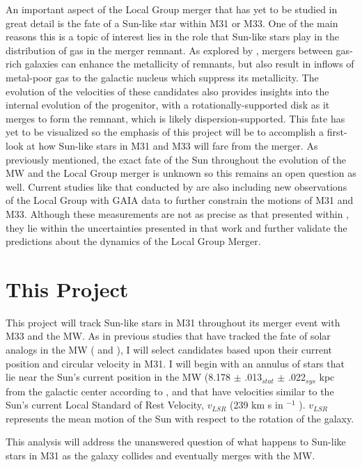 \documentclass{aastex63}
\begin{document}
An important aspect of the Local Group merger that has yet to be studied in great detail is the fate of a Sun-like star within M31 or M33. One of the main reasons this is a topic of interest lies in the role that Sun-like stars play in the distribution of gas in the merger remnant. As explored by \cite{2012ApJ...746..108T}, mergers between gas-rich galaxies can enhance the metallicity of remnants, but also result in inflows of metal-poor gas to the galactic nucleus which suppress its metallicity. The evolution of the velocities of these candidates also provides insights into the internal evolution of the progenitor, with a rotationally-supported disk as it merges to form the remnant, which is likely dispersion-supported. This fate has yet to be visualized so the emphasis of this project will be to accomplish a first-look at how Sun-like stars in M31 and M33 will fare from the merger. As previously mentioned, the exact fate of the Sun throughout the evolution of the MW and the Local Group merger is unknown so this remains an open question as well. Current studies like that conducted by \cite{2019ApJ...872...24V} are also including new observations of the Local Group with GAIA data to further constrain the motions of M31 and M33. Although these measurements are not as precise as that presented within \citep{2012ApJ...753....9V}, they lie within the uncertainties presented in that work and further validate the predictions about the dynamics of the Local Group Merger.

\section{This Project} \label{sec:proposal}
This project will track Sun-like stars in M31 throughout its merger event with M33 and the MW. As in previous studies that have tracked the fate of solar analogs in the MW  (\cite{2012ApJ...753....9V} and \cite{2008MNRAS.386..461C}), I will select candidates based upon their current position and circular velocity in M31. I will begin with an annulus of stars that lie near the Sun's current position in the MW (8.178 $\pm$ .013$_{stat}$ $\pm$ .022$_{sys}$ kpc  from the galactic center according to \citep{2019A&A...625L..10G}, and that have velocities similar to the Sun's current Local Standard of Rest Velocity, $v_{LSR}$ (239 km s in $^{-1}$ \cite{2012ApJ...753....8V}). $v_{LSR}$ represents the mean motion of the Sun with respect to the rotation of the galaxy. 

This analysis will address the unanswered question of what happens to Sun-like stars in M31 as the galaxy collides and eventually merges with the MW.
\end{document}
